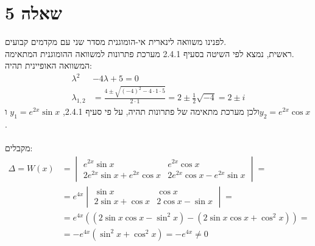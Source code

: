 \documentclass{article}
\begin{document}
\section*{שאלה 5}
לפנינו משוואה לינארית אי-הומוגנית מסדר שני עם מקדמים קבועים. \\
ראשית, נמצא לפי השיטה בסעיף 2.4.1 מערכת פתרונות למשוואה ההומוגנית המתאימה. \\
המשוואה האופיינית תהיה:
\begin{align*}
    \lambda^2     & -4\lambda+5=0                                                                         \\
    \lambda_{1,2} & =\frac{4\pm\sqrt{(-4)^2-4\cdot 1 \cdot 5}}{2\cdot 1}=2\pm \frac{1}{2}\sqrt{-4}=2\pm i
\end{align*}
ולכן מערכת מתאימה של פתרונות תהיה, על פי סעיף 2.4.1, $y_1=e^{2x}\sin x$ ו$y_2=e^{2x}\cos x$.\\\\
מקבלים:
\begin{align*}
    \Delta=W(x) & =\begin{vmatrix}
                       e^{2x}\sin x                 & e^{2x}\cos x                 \\
                       2e^{2x}\sin x + e^{2x}\cos x & 2e^{2x}\cos x - e^{2x}\sin x
                   \end{vmatrix} =        \\
                & = e^{4x} \begin{vmatrix}
                               \sin x           & \cos x           \\
                               2\sin x + \cos x & 2\cos x - \sin x
                           \end{vmatrix} =                        \\
                & = e^{4x}((2\sin x \cos x - \sin^2 x)-(2\sin x \cos x + \cos^2 x)) = \\
                & = -e^{4x} (\sin^2 x + \cos^2 x) = -e^{4x}\ne 0
\end{align*}
\end{document}

